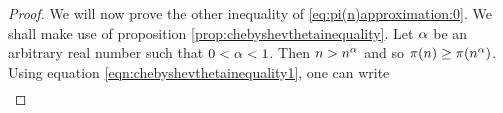 \begin{proof}
		We will now prove the other inequality of \eqref{eq:pi(n)approximation:0}. We shall make use of proposition \eqref{prop:chebyshevthetainequality}. 
		Let $\alpha$ be an arbitrary real number such that $0 < \alpha < 1$. Then $n> n^{\alpha}$ and so $\pi(n) \geq \pi(n^{\alpha})$. Using equation \eqref{eqn:chebyshevthetainequality1}, one can write
			\begin{align*}

\end{align*}
\end{proof}
